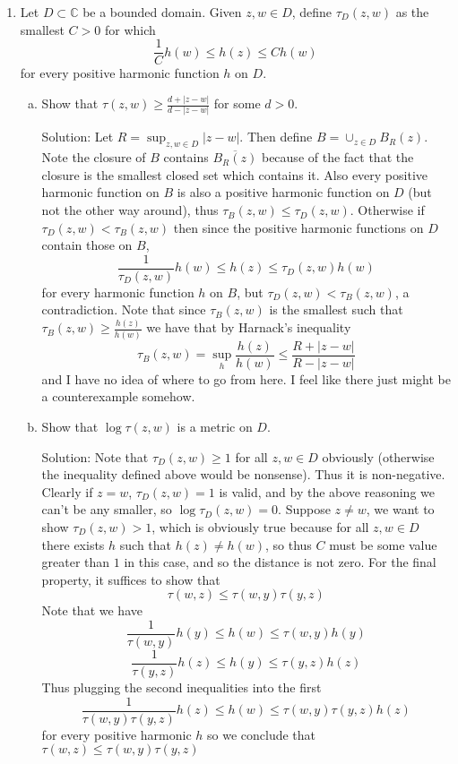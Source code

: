 \documentclass[11pt]{article}
\newcommand{\C}{\mathbb{C}}
\begin{document}
\begin{enumerate}[(1)]
\begin{enumerate}[(a)]
\end{enumerate}

\item Let $D \subset \C$ be a bounded domain. Given $z, w \in D$, define $\tau_D(z,w)$ as the smallest $C > 0$ for which 
$$ \frac{1}{C} h(w) \leq h(z) \leq Ch(w)$$
for every positive harmonic function $h$ on $D$.

\begin{enumerate}[(a)]
\item Show that $\tau(z,w) \geq \frac{d + |z-w|}{d - |z-w|}$ for some $d > 0$.

Solution: Let $R = \sup_{z, w \in D} |z - w|$. Then define $B = \cup_{z \in D} B_R(z)$. Note the closure of $B$ contains $\overline{B_R(z)}$ because of the fact that the closure is the smallest closed set which contains it. Also every positive harmonic function on $B$ is also a positive harmonic function on $D$ (but not the other way around), thus $\tau_B(z, w) \leq \tau_D(z,w)$. Otherwise if $\tau_D(z,w) < \tau_B(z,w)$ then since the positive harmonic functions on $D$ contain those on $B$,
$$\frac{1}{\tau_D(z,w)}h(w) \leq h(z) \leq \tau_D(z, w) h(w)$$
for every harmonic function $h$ on $B$, but $\tau_D(z,w) < \tau_B(z, w)$, a contradiction. Note that since $\tau_B(z,w)$ is the smallest such that $\tau_B(z,w) \geq \frac{h(z)}{h(w)}$ we have that by Harnack's inequality
$$ \tau_B(z,w) = \sup_h \frac{h(z)}{h(w)} \leq \frac{R + |z - w|}{R - |z - w|}$$
and I have no idea of where to go from here. I feel like there just might be a counterexample somehow.

\item Show that $\log \tau(z, w)$ is a metric on $D$.

Solution: Note that $\tau_D(z,w) \geq 1$ for all $z ,w \in D$ obviously (otherwise the inequality defined above would be nonsense). Thus it is non-negative. Clearly if $z = w$, $\tau_D(z,w) = 1$ is valid, and by the above reasoning we can't be any smaller, so $\log \tau_D(z,w) = 0$. Suppose $z \neq w$, we want to show $\tau_D(z,w) >1$, which is obviously true because for all $z,w \in D$ there exists $h$ such that $h(z) \neq h(w)$, so thus $C$ must be some value greater than $1$ in this case, and so the distance is not zero. For the final property, it suffices to show that 
$$ \tau(w, z) \leq \tau(w, y) \tau(y, z) $$ 
Note that we have 
$$ \frac{1}{\tau(w, y)} h(y) \leq h(w) \leq \tau(w,y)h(y)$$
$$ \frac{1}{\tau(y, z)} h(z) \leq h(y) \leq \tau(y,z)h(z) $$
Thus plugging the second inequalities into the first 
$$ \frac{1}{\tau(w,y)\tau(y,z)} h(z) \leq h(w) \leq \tau(w,y)\tau(y,z) h(z) $$
for every positive harmonic $h$ so we conclude that $\tau(w,z) \leq \tau(w, y)\tau(y,z)$



\end{enumerate}
\end{enumerate}
\end{document}
